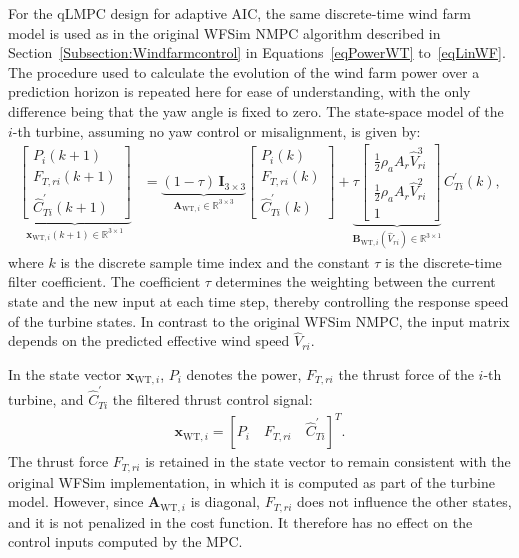 For the qLMPC design for adaptive AIC, the same discrete-time wind farm model is used as in the original WFSim NMPC algorithm described in Section~\ref{Subsection:Windfarmcontrol} in Equations~\eqref{eqPowerWT} to~\eqref{eqLinWF}. The procedure used to calculate the evolution of the wind farm power over a prediction horizon is repeated here for ease of understanding, with the only difference being that the yaw angle is fixed to zero. The state-space model of the $i$-th turbine, assuming no yaw control or misalignment, is given by:
\begin{align} \label{eqPowerWTAIC_vector}
    \underbrace{
        \begin{bmatrix}
            P_i(k+1) \\[0.8mm]
            F_{T,ri}(k+1) \\[0.8mm]
            \hat{C}_{Ti}^\prime(k+1)
    \end{bmatrix}}_{\bm{x}_{\text{WT},i}(k+1) \in {\mathbb{R}}^{3\times 1}}
    &=
    \underbrace{(1-\tau)\,\bm{I}_{3\times3}}_{\bm{A}_{\text{WT},i} \in {\mathbb{R}}^{3\times 3}}
    \begin{bmatrix}
        P_i(k) \\[0.8mm]
        F_{T,ri}(k) \\[0.8mm]
        \hat{C}_{Ti}^\prime(k)
    \end{bmatrix}
    +
    \underbrace{\tau
        \begin{bmatrix}
            \tfrac{1}{2}\rho_a A_r \hat{V}_{ri}^3 \\[0.8mm]
            \tfrac{1}{2}\rho_a A_r \hat{V}_{ri}^2 \\[0.8mm]
            1
    \end{bmatrix}}_{\bm{B}_{\text{WT},i}(\hat{V}_{ri}) \in {\mathbb{R}}^{3\times 1}} \, C_{Ti}^\prime(k),
\end{align}
where $k$ is the discrete sample time index and the constant $\tau$ is the discrete-time filter coefficient. The coefficient $\tau$ determines the weighting between the current state and the new input at each time step, thereby controlling the response speed of the turbine states. In contrast to the original WFSim NMPC, the input matrix depends on the predicted effective wind speed $\hat{V}_{ri}$.

In the state vector $\bm{x}_{\text{WT},i}$, $P_i$ denotes the power, $F_{T,ri}$ the thrust force of the $i$-th turbine, and $\hat{C}_{Ti}^\prime$ the filtered thrust control signal:
\begin{align*}
    \bm{x}_{\text{WT},i} = [P_i \quad F_{T,ri} \quad \hat{C}_{Ti}^\prime]^T.
\end{align*}
The thrust force $F_{T,ri}$ is retained in the state vector to remain consistent with the original WFSim implementation, in which it is computed as part of the turbine model. However, since $\bm{A}_{\text{WT},i}$ is diagonal, $F_{T,ri}$ does not influence the other states, and it is not penalized in the cost function. It therefore has no effect on the control inputs computed by the MPC.

